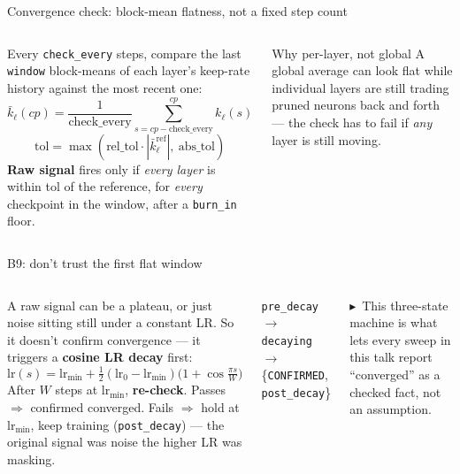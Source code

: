 \documentclass[10pt,aspectratio=169]{beamer}
\newcommand{\tk}[1]{{\scriptsize \textcolor{accent}{$\blacktriangleright$}\ #1}}
\begin{document}
\begin{frame}{Convergence check: block-mean flatness, not a fixed step count}
  \begin{columns}[T,onlytextwidth]
      Every \texttt{check\_every} steps, compare the last \texttt{window} block-means of each layer's keep-rate history against the most recent one:
      \[
        \bar{k}_\ell(cp) = \frac{1}{\text{check\_every}} \sum_{s=cp-\text{check\_every}}^{cp} k_\ell(s)
      \]
      \[
        \text{tol} = \max(\text{rel\_tol}\cdot|\bar{k}_\ell^{\text{ref}}|,\ \text{abs\_tol})
      \]
      \textbf{Raw signal} fires only if \emph{every layer} is within tol of the reference, for \emph{every} checkpoint in the window, after a \texttt{burn\_in} floor.
      \begin{block}{Why per-layer, not global}
        A global average can look flat while individual layers are still trading pruned neurons back and forth --- the check has to fail if \emph{any} layer is still moving.
      \end{block}
  \end{columns}
\end{frame}

\begin{frame}{B9: don't trust the first flat window}
  \begin{columns}[T,onlytextwidth]
      A raw signal can be a plateau, or just noise sitting still under a constant LR. So it doesn't confirm convergence --- it triggers a \textbf{cosine LR decay} first:
      \[
        \text{lr}(s) = \text{lr}_{\min} + \tfrac12(\text{lr}_0-\text{lr}_{\min})\Big(1+\cos\tfrac{\pi s}{W}\Big)
      \]
      After $W$ steps at $\text{lr}_{\min}$, \textbf{re-check}. Passes $\Rightarrow$ confirmed converged. Fails $\Rightarrow$ hold at $\text{lr}_{\min}$, keep training (\texttt{post\_decay}) --- the original signal was noise the higher LR was masking.
      \begin{center}\small
        \texttt{pre\_decay} $\to$ \texttt{decaying} $\to$ \{\texttt{CONFIRMED}, \texttt{post\_decay}\}
      \end{center}
      \vspace{0.4em}
      \tk{This three-state machine is what lets every sweep in this talk report ``converged'' as a checked fact, not an assumption.}
  \end{columns}
\end{frame}
\end{document}

